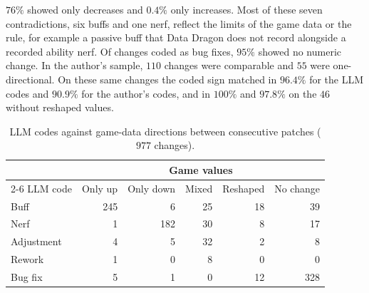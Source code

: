 \documentclass[11pt]{article}
\begin{document}
$76\%$ showed only decreases and $0.4\%$ only increases. Most of these seven contradictions, six buffs and one nerf, reflect the limits of the game data or the rule, for example a passive buff that Data Dragon does not record alongside a recorded ability nerf. Of changes coded as bug fixes, $95\%$ showed no numeric change. In the author's sample, $110$ changes were comparable and $55$ were one-directional. On these same changes the coded sign matched in $96.4\%$ for the LLM codes and $90.9\%$ for the author's codes, and in $100\%$ and $97.8\%$ on the $46$ without reshaped values.

\begin{table}[h]
\centering
\small
\caption{LLM codes against game-data directions between consecutive patches ($977$ changes).}
\label{tab:gamedata}
\begin{tabular}{lrrrrr}
\toprule
 & \multicolumn{5}{c}{Game values} \\
\cmidrule(lr){2-6}
LLM code & Only up & Only down & Mixed & Reshaped & No change \\
\midrule
Buff & 245 & 6 & 25 & 18 & 39 \\
Nerf & 1 & 182 & 30 & 8 & 17 \\
Adjustment & 4 & 5 & 32 & 2 & 8 \\
Rework & 1 & 0 & 8 & 0 & 0 \\
Bug fix & 5 & 1 & 0 & 12 & 328 \\
\bottomrule
\end{tabular}
\end{table}
\end{document}
